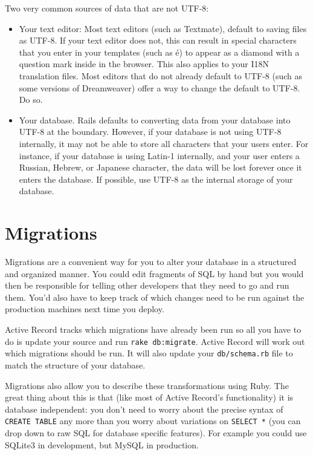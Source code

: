 \documentclass[10pt]{book}
\begin{document}
Two very common sources of data that are not UTF-8:
\begin{itemize}
	\item Your text editor: Most text editors (such as Textmate), default to saving files as   UTF-8. If your text editor does not, this can result in special characters that you   enter in your templates (such as é) to appear as a diamond with a question mark inside   in the browser. This also applies to your I18N translation files.   Most editors that do not already default to UTF-8 (such as some versions of   Dreamweaver) offer a way to change the default to UTF-8. Do so.
	\item Your database. Rails defaults to converting data from your database into UTF-8 at   the boundary. However, if your database is not using UTF-8 internally, it may not   be able to store all characters that your users enter. For instance, if your database   is using Latin-1 internally, and your user enters a Russian, Hebrew, or Japanese   character, the data will be lost forever once it enters the database. If possible,   use UTF-8 as the internal storage of your database.
\end{itemize}

\chapter{Migrations}

Migrations are a convenient way for you to alter your database in a structured and organized manner. You could edit fragments of SQL by hand but you would then be responsible for telling other developers that they need to go and run them. You’d also have to keep track of which changes need to be run against the production machines next time you deploy.

Active Record tracks which migrations have already been run so all you have to do is update your source and run \texttt{rake db:migrate}. Active Record will work out which migrations should be run. It will also update your \texttt{db/schema.rb} file to match the structure of your database.

Migrations also allow you to describe these transformations using Ruby. The great thing about this is that (like most of Active Record’s functionality) it is database independent: you don’t need to worry about the precise syntax of \texttt{CREATE TABLE} any more than you worry about variations on \texttt{SELECT *} (you can drop down to raw SQL for database specific features). For example you could use SQLite3 in development, but MySQL in production.
\end{document}
